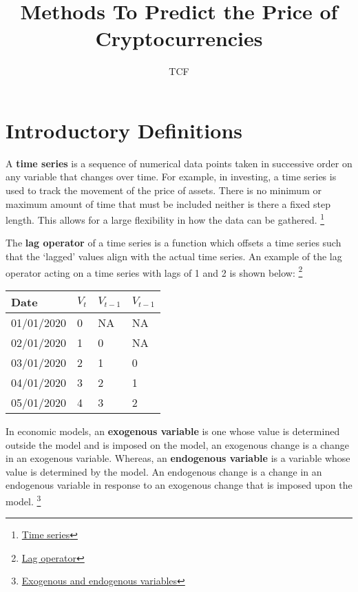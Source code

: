 \documentclass[11pt]{article}
\title{\vspace{6cm} \textbf{Methods To Predict the Price of Cryptocurrencies}}
\date{}
\author{TCF}
\begin{document}
\maketitle
\pagebreak

\section{Introductory Definitions}

A \textbf{time series} is a sequence of numerical data points taken in successive order on any variable that changes over time. For example, in investing, a time series is used to track the movement of the price of assets. There is no minimum or maximum amount of time that must be included neither is there a fixed step length. This allows for a large flexibility in how the data can be gathered. \footnote[1]{\href{https://www.investopedia.com/terms/t/timeseries.asp}{Time series}}

The \textbf{lag operator} of a time series is a function which offsets a time series such that the `lagged' values align with the actual time series. An example of the lag operator acting on a time series with lags of 1 and 2 is shown below: \footnote[2]{\href{https://www.business-science.io/timeseries-analysis/2017/08/30/tidy-timeseries-analysis-pt-4.html}{Lag operator}}
\begin{table}[h]
	\centering
	\begin{tabular}{ |p{2cm}||p{2cm}|p{2cm}|p{2cm}| }
	\hline
	Date & $V_t$ & $V_{t-1}$ & $V_{t-1}$ \\
	\hline
	01/01/2020 & 0 & NA & NA \\
	\hline
	02/01/2020 & 1 & 0 & NA \\
	\hline
	03/01/2020 & 2 & 1 & 0 \\
	\hline
	04/01/2020 & 3 & 2 & 1 \\
	\hline
	05/01/2020 & 4 & 3 & 2 \\
	\hline
	\end{tabular}
\end{table}

In economic models, an \textbf{exogenous variable} is one whose value is determined outside the model and is imposed on the model, an exogenous change is a change in an exogenous variable. Whereas, an \textbf{endogenous variable} is a variable whose value is determined by the model. An endogenous change is a change in an endogenous variable in response to an exogenous change that is imposed upon the model. \footnote[3]{\href{https://en.wikipedia.org/wiki/Exogenous_and_endogenous_variables}{Exogenous and endogenous variables}}
\end{document}
